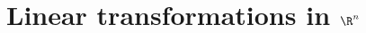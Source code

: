 \chapter{Linear transformations in \texorpdfstring{$\R^{n}$}{Rn}}
\label{cha:linear-transformation}
